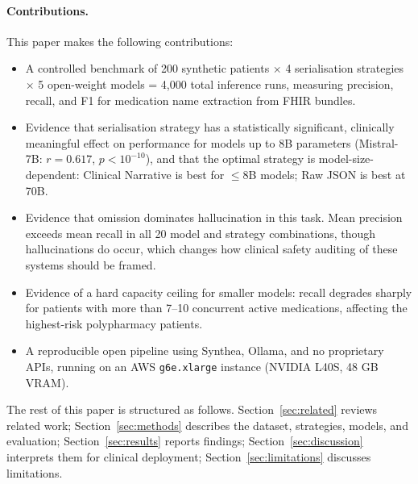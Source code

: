 \paragraph{Contributions.} This paper makes the following contributions:

\begin{itemize}
  \item A controlled benchmark of 200 synthetic patients $\times$ 4 serialisation
        strategies $\times$ 5 open-weight models = 4,000 total inference runs, measuring
        precision, recall, and F1 for medication name extraction from FHIR bundles.

  \item Evidence that serialisation strategy has a statistically significant,
        clinically meaningful effect on performance for models up to 8B parameters
        (Mistral-7B: $r = 0.617$, $p < 10^{-10}$), and that the optimal strategy is
        model-size-dependent: Clinical Narrative is best for $\leq$8B models; Raw JSON
        is best at 70B.

  \item Evidence that omission dominates hallucination in this task. Mean precision
        exceeds mean recall in all 20 model and strategy combinations, though
        hallucinations do occur, which changes how clinical safety auditing of these
        systems should be framed.

  \item Evidence of a hard capacity ceiling for smaller models: recall degrades sharply
        for patients with more than 7--10 concurrent active medications, affecting the
        highest-risk polypharmacy patients.

  \item A reproducible open pipeline using Synthea, Ollama, and no proprietary APIs,
        running on an AWS \texttt{g6e.xlarge} instance (NVIDIA L40S, 48 GB VRAM).
\end{itemize}

The rest of this paper is structured as follows. Section~\ref{sec:related} reviews
related work; Section~\ref{sec:methods} describes the dataset, strategies, models,
and evaluation; Section~\ref{sec:results} reports findings; Section~\ref{sec:discussion}
interprets them for clinical deployment; Section~\ref{sec:limitations} discusses
limitations.
